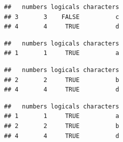 \documentclass[
]{book}
\newenvironment{Shaded}{\begin{snugshade}}{\end{snugshade}}
\newcommand{\DecValTok}[1]{\textcolor[rgb]{0.00,0.00,0.81}{#1}}
\newcommand{\KeywordTok}[1]{\textcolor[rgb]{0.13,0.29,0.53}{\textbf{#1}}}
\newcommand{\NormalTok}[1]{#1}
\newcommand{\OperatorTok}[1]{\textcolor[rgb]{0.81,0.36,0.00}{\textbf{#1}}}
\newcommand{\OtherTok}[1]{\textcolor[rgb]{0.56,0.35,0.01}{#1}}
\newcommand{\StringTok}[1]{\textcolor[rgb]{0.31,0.60,0.02}{#1}}
\begin{document}
\begin{verbatim}
##   numbers logicals characters
## 3       3    FALSE          c
## 4       4     TRUE          d
\end{verbatim}

\begin{Shaded}
\end{Shaded}

\begin{verbatim}
##   numbers logicals characters
## 1       1     TRUE          a
\end{verbatim}

\begin{Shaded}
\end{Shaded}

\begin{verbatim}
##   numbers logicals characters
## 2       2     TRUE          b
## 4       4     TRUE          d
\end{verbatim}

\begin{Shaded}
\end{Shaded}

\begin{verbatim}
##   numbers logicals characters
## 1       1     TRUE          a
## 2       2     TRUE          b
## 4       4     TRUE          d
\end{verbatim}
\end{document}
